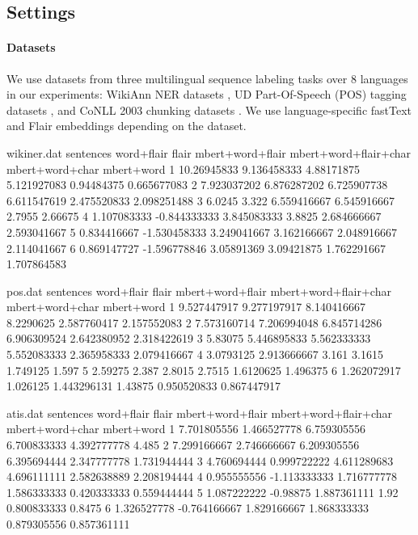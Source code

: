 \documentclass[11pt,a4paper]{article}
\begin{document}
\subsection{Settings}
\paragraph{Datasets}
We use datasets from three multilingual sequence labeling tasks over 8 languages in our experiments: WikiAnn NER datasets \cite{pan-etal-2017-cross}, UD Part-Of-Speech (POS) tagging datasets \cite{nivre-etal-2016-universal}, and CoNLL 2003 chunking datasets \cite{tjong-kim-sang-de-meulder-2003-introduction}. We use language-specific fastText and Flair embeddings depending on the dataset. 





\begin{filecontents}{wikiner.dat}
sentences word+flair flair mbert+word+flair mbert+word+flair+char mbert+word+char mbert+word
1 10.26945833 9.136458333 4.88171875 5.121927083 0.94484375 0.665677083
2 7.923037202 6.876287202 6.725907738 6.611547619 2.475520833 2.098251488
3 6.0245 3.322 6.559416667 6.545916667 2.7955 2.66675
4 1.107083333 -0.844333333 3.845083333 3.8825 2.684666667 2.593041667
5 0.834416667 -1.530458333 3.249041667 3.162166667 2.048916667 2.114041667
6 0.869147727 -1.596778846 3.05891369 3.09421875 1.762291667 1.707864583
\end{filecontents}

\begin{filecontents}{pos.dat}
sentences word+flair flair mbert+word+flair mbert+word+flair+char mbert+word+char mbert+word
1 9.527447917 9.277197917 8.140416667 8.2290625 2.587760417 2.157552083
2 7.573160714 7.206994048 6.845714286 6.906309524 2.642380952 2.318422619
3 5.83075 5.446895833 5.562333333 5.552083333 2.365958333 2.079416667
4 3.0793125 2.913666667 3.161 3.1615 1.749125 1.597
5 2.59275 2.387 2.8015 2.7515 1.6120625 1.496375
6 1.262072917 1.026125 1.443296131 1.43875 0.950520833 0.867447917
\end{filecontents}


\begin{filecontents}{atis.dat}
sentences word+flair flair mbert+word+flair mbert+word+flair+char mbert+word+char mbert+word
1 7.701805556 1.466527778 6.759305556 6.700833333 4.392777778 4.485
2 7.299166667 2.746666667 6.209305556 6.395694444 2.347777778 1.731944444
3 4.760694444 0.999722222 4.611289683 4.696111111 2.582638889 2.208194444
4 0.955555556 -1.113333333 1.716777778 1.586333333 0.420333333 0.559444444
5 1.087222222 -0.98875 1.887361111 1.92 0.800833333 0.8475
6 1.326527778 -0.764166667 1.829166667 1.868333333 0.879305556 0.857361111
\end{filecontents}
\end{document}
